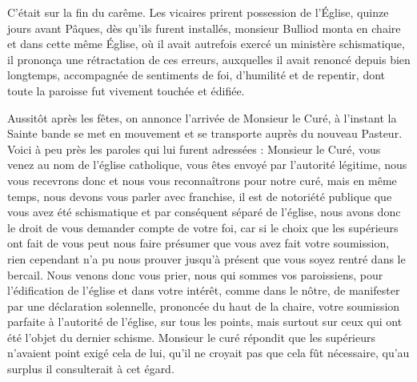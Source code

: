\documentclass[11pt,a4paper]{report}
\begin{document}
C'était sur la fin du carême. Les vicaires prirent possession de l'Église, quinze jours avant Pâques, dès qu'ils furent installés, monsieur Bulliod monta en chaire et dans cette même Église, où il avait autrefois exercé un ministère schismatique, il prononça une rétractation de ces erreurs, auxquelles il avait renoncé depuis bien longtemps, accompagnée de sentiments de foi, d'humilité et de repentir, dont toute la paroisse fut vivement touchée et édifiée.

Aussitôt après les fêtes, on annonce l'arrivée de Monsieur le Curé, à l'instant la Sainte bande se met en mouvement et se transporte auprès du nouveau Pasteur. Voici à peu près les paroles qui lui furent adressées : Monsieur le Curé, vous venez au nom de l'église catholique, vous êtes envoyé par l'autorité légitime, nous vous recevrons donc et nous vous reconnaîtrons pour notre curé, mais en même temps, nous devons vous parler avec franchise, il est de notoriété publique que vous avez été schismatique et par conséquent séparé de l'église, nous avons donc le droit de vous demander compte de votre foi, car si le choix que les supérieurs ont fait de vous peut nous faire présumer que vous avez fait votre soumission, rien cependant n'a pu nous prouver jusqu'à présent que vous soyez rentré dans le bercail. Nous venons donc vous prier, nous qui sommes vos paroissiens, pour l'édification de l'église et dans votre intérêt, comme dans le nôtre, de manifester par une déclaration solennelle, prononcée du haut de la chaire, votre soumission parfaite à l'autorité de l'église, sur tous les points, mais surtout sur ceux qui ont été l'objet du dernier schisme. Monsieur le curé répondit que les supérieurs n'avaient point exigé cela de lui, qu'il ne croyait pas que cela fût nécessaire, qu'au surplus il consulterait à cet égard.
\end{document}
